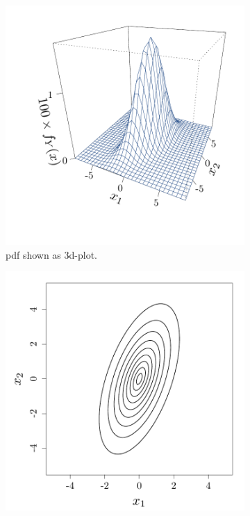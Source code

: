 \documentclass[twoside,openright]{report}
\begin{document}
\begin{figure}[ht!]
        \centering
        \begin{subfigure}[b]{0.34\textwidth}
                \includegraphics[width=\textwidth]{figures/ch1_pdf1}
                \caption{pdf shown as 3d-plot.}
        \end{subfigure}%
        \hspace{1cm}       
        \begin{subfigure}[b]{0.34\textwidth}
                \includegraphics[width=\textwidth]{figures/ch1_pdf2}

\end{subfigure}
\end{figure}
\end{document}
